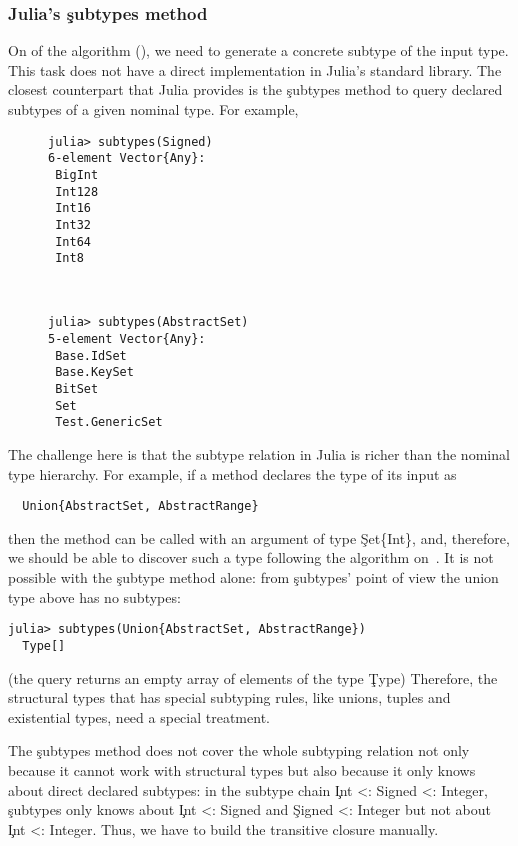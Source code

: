 \subsubsection{Julia's \c{subtypes} method}

On  of the algorithm (), we need to generate a
concrete subtype of the input type. This task does not have a direct
implementation in Julia's standard library. The closest counterpart that Julia
provides is the \c{subtypes} method to query declared subtypes of a given
nominal type. For example,
\begin{figure}[h]
\begin{minipage}{.49\textwidth}
\begin{lstlisting}[style=jterm]
julia> subtypes(Signed)
6-element Vector{Any}:
 BigInt
 Int128
 Int16
 Int32
 Int64
 Int8
\end{lstlisting}
\end{minipage}
~
\begin{minipage}{.49\textwidth}
\begin{lstlisting}[style=jterm]
julia> subtypes(AbstractSet)
5-element Vector{Any}:
 Base.IdSet
 Base.KeySet
 BitSet
 Set
 Test.GenericSet

\end{lstlisting}
\end{minipage}
\end{figure}

The challenge here is that the subtype relation in Julia is richer than the
nominal type hierarchy. For example, if a method declares the type of its input
as
\begin{lstlisting}
  Union{AbstractSet, AbstractRange}
\end{lstlisting}
then the method can be called with an argument of type \c{Set\{Int\}}, and,
therefore, we should be able to discover such a type following the algorithm
on~. It is not possible with the \c{subtype} method alone:
from \c{subtypes}' point of view the union type above has no subtypes:
\begin{lstlisting}[style=jterm]
  julia> subtypes(Union{AbstractSet, AbstractRange})
  Type[]
\end{lstlisting}
(the query returns an empty array of elements of the type \c{Type})
Therefore, the structural types that has special subtyping rules, like unions,
tuples and existential types, need a special treatment.

The \c{subtypes} method does not cover the whole subtyping relation not only
because it cannot work with structural types but also because it only knows
about direct declared subtypes: in the subtype chain
\c{Int <: Signed <: Integer}, \c{subtypes} only knows about \c{Int <: Signed}
and \c{Signed <: Integer} but not about \c{Int <: Integer}. Thus, we have to build
the transitive closure manually.

